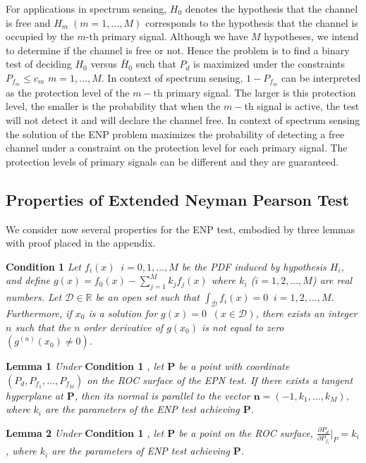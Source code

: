 \documentclass[12pt,journal,a4paper,twoside,onecolumn]{IEEEtran}
\begin{document}
\begin{spacing}{2.5}
For applications in spectrum sensing, $H_0$ denotes the hypothesis that the channel is free and $H_m \;(m=1, ..., M)$ corresponds to the hypothesis that the channel is occupied by the $m$-th primary signal. Although we have $M$ hypotheses, we intend to determine if the channel is free or not. Hence the problem is to find a binary test of deciding $H_0$ versus $\bar{H}_0$ such that $P_d$ is maximized under the constraints $P_{f_m} \leq c_m$ $m = 1, ..., M$. In context of spectrum sensing, $1-P_{f_m}$ can be interpreted as the protection level of the $m-$th primary signal. The larger is this protection level, the smaller is the probability that when the $m-$th signal is active, the test will not detect it and will declare the channel free. In context of spectrum sensing the solution of the ENP problem maximizes the probability of detecting a free channel under a constraint on the protection level for each primary signal. The protection levels of primary signals can be different and they are guaranteed.

\subsection{Properties of Extended Neyman Pearson Test}
We consider now several properties for the ENP test, embodied by three lemmas with proof placed in the appendix.

\noindent \textbf{Condition 1}
\textit{
\noindent Let $f_i(x) \;\;i=0, 1, ..., M$ be the PDF induced by hypothesis $H_i$, and define $g(x) = f_0(x) - \sum_{j=1}^{M} k_jf_j(x)$ where $k_i$  ($i = 1, 2, ..., M$) are real numbers. Let $\mathcal{D} \in \mathbb{R}$ be an open set such that $\int_{\bar{\mathcal{D}}}f_i(x)=0\;\;i = 1, 2, ..., M$. Furthermore,  if $x_0$ is a solution  for $g(x) = 0 \;\;(x \in \mathcal{D})$, there exists an integer $n$ such that  the $n$ order derivative of $g(x_0)$ is not equal to zero $(g^{(n)}(x_0) \neq 0)$.
}

\noindent \textbf{Lemma 1}
\textit{
\noindent Under}
\textbf{Condition 1}
\textit{, let $\mathbf{P}$ be a point with coordinate $(P_d, P_{f_1}, ..., P_{f_M})$ on the ROC surface of the EPN test. If there exists a tangent hyperplane at $\mathbf{P}$, then its normal is parallel to the vector $\mathbf{n} = (-1, k_1, ..., k_M)$, where $k_i$ are the parameters of the ENP test achieving $\mathbf{P}$.
}

\noindent \textbf{Lemma 2}
\textit{
\noindent
Under}
\textbf{Condition 1}
\textit{, let $\mathbf{P}$ be a point on the ROC surface, $\frac{\partial P_d}{\partial P_{f_i}} \bigg|_P = k_i$, where $k_i$ are the parameters of ENP test achieving $\mathbf{P}$.
}


\end{spacing}
\end{document}
